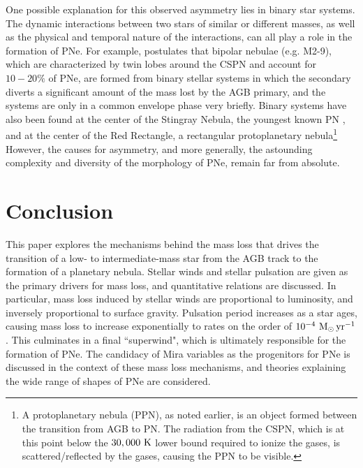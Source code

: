 \documentclass[twocolumn]{aastex63}
\begin{document}
One possible explanation for this observed asymmetry lies in binary star systems. The dynamic interactions between two stars of similar or different masses, as well as the physical and temporal nature of the interactions, can all play a role in the formation of PNe. For example, \cite{soker1998} postulates that bipolar nebulae (e.g. M2-9), which are characterized by twin lobes around the CSPN and account for $10-20\%$ of PNe, are formed from binary stellar systems in which the secondary diverts a significant amount of the mass lost by the AGB primary, and the systems are only in a common envelope phase very briefly. Binary systems have also been found at the center of the Stingray Nebula, the youngest known PN \citep{bobrowsky}, and at the center of the Red Rectangle, a rectangular protoplanetary nebula\footnote{A protoplanetary nebula (PPN), as noted earlier, is an object formed between the transition from AGB to PN. The radiation from the CSPN, which is at this point below the $30,000~{\rm K}$ lower bound required to ionize the gases, is scattered/reflected by the gases, causing the PPN to be visible.} \citep{cohen} However, the causes for asymmetry, and more generally, the astounding complexity and diversity of the morphology of PNe, remain far from absolute. 

\section{Conclusion}\label{sec:conclusion}

This paper explores the mechanisms behind the mass loss that drives the transition of a low- to intermediate-mass star from the AGB track to the formation of a planetary nebula. Stellar winds and stellar pulsation are given as the primary drivers for mass loss, and quantitative relations are discussed. In particular, mass loss induced by stellar winds are proportional to luminosity, and inversely proportional to surface gravity. Pulsation period increases as a star ages, causing mass loss to increase exponentially to rates on the order of $10^{-4}~{\rm M_\odot\,yr^{-1}}$. This culminates in a final ``superwind", which is ultimately responsible for the formation of PNe. The candidacy of Mira variables as the progenitors for PNe is discussed in the context of these mass loss mechanisms, and theories explaining the wide range of shapes of PNe are considered. 

\newpage
\nocite{*}

\end{document}
